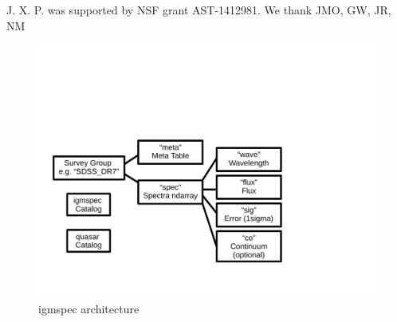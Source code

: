 \documentclass[12pt,preprint]{aastex}
\begin{document}
\acknowledgments

J. X. P. was supported by NSF grant AST-1412981.
We thank JMO, GW, JR, NM


%
%

%
%


\begin{figure}
\includegraphics[width=6in]{architecture_v02.pdf}
\caption{igmspec architecture
}
\label{fig:arch}
\end{figure}
\end{document}
